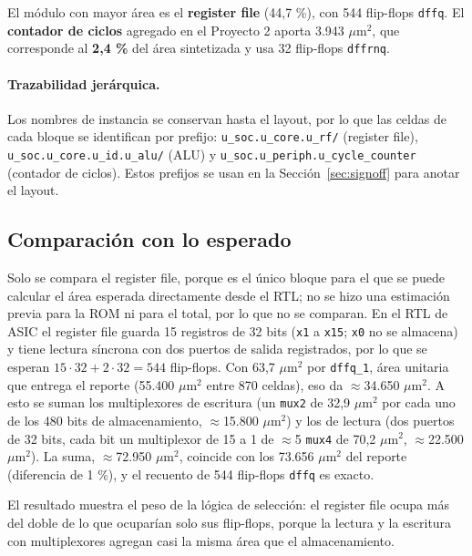 \documentclass[11pt,letterpaper]{article}
\newcommand{\code}[1]{\texttt{#1}}
\begin{document}
El módulo con mayor área es el \textbf{register file} (44,7 \%), con 544 flip-flops \code{dffq}. El \textbf{contador de ciclos} agregado en el Proyecto 2 aporta 3.943 $\mu$m$^2$, que corresponde al \textbf{2,4 \%} del área sintetizada y usa 32 flip-flops \code{dffrnq}.

\paragraph{Trazabilidad jerárquica.} Los nombres de instancia se conservan hasta el layout, por lo que las celdas de cada bloque se identifican por prefijo: \code{u\_soc.u\_core.u\_rf/} (register file), \allowbreak\code{u\_soc.u\_core.u\_id.u\_alu/} (ALU) y \allowbreak\code{u\_soc.u\_periph.u\_cycle\_counter} (contador de ciclos). Estos prefijos se usan en la Sección~\ref{sec:signoff} para anotar el layout.

\subsection{Comparación con lo esperado}

Solo se compara el register file, porque es el único bloque para el que se puede calcular el área esperada directamente desde el RTL; no se hizo una estimación previa para la ROM ni para el total, por lo que no se comparan. En el RTL de ASIC el register file guarda 15 registros de 32 bits (\code{x1} a \code{x15}; \code{x0} no se almacena) y tiene lectura síncrona con dos puertos de salida registrados, por lo que se esperan $15\cdot 32 + 2\cdot 32 = 544$ flip-flops. Con 63,7 $\mu$m$^2$ por \code{dffq\_1}, área unitaria que entrega el reporte (55.400 $\mu$m$^2$ entre 870 celdas), eso da $\approx$34.650 $\mu$m$^2$. A esto se suman los multiplexores de escritura (un \code{mux2} de 32,9 $\mu$m$^2$ por cada uno de los 480 bits de almacenamiento, $\approx$15.800 $\mu$m$^2$) y los de lectura (dos puertos de 32 bits, cada bit un multiplexor de 15 a 1 de $\approx$5 \code{mux4} de 70,2 $\mu$m$^2$, $\approx$22.500 $\mu$m$^2$). La suma, $\approx$72.950 $\mu$m$^2$, coincide con los 73.656 $\mu$m$^2$ del reporte (diferencia de 1 \%), y el recuento de 544 flip-flops \code{dffq} es exacto.

El resultado muestra el peso de la lógica de selección: el register file ocupa más del doble de lo que ocuparían solo sus flip-flops, porque la lectura y la escritura con multiplexores agregan casi la misma área que el almacenamiento.

\end{document}
